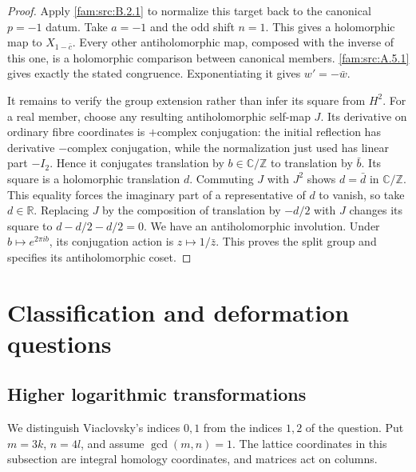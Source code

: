 \begin{proof}
Apply \ref{fam:src:B.2.1} to normalize this target back to the canonical $p=-1$ datum. Take $a=-1$ and the odd shift $n=1$. This gives a holomorphic map to $X_{1-\bar c}$. Every other antiholomorphic map, composed with the inverse of this one, is a holomorphic comparison between canonical members. \ref{fam:src:A.5.1} gives exactly the stated congruence. Exponentiating it gives $w'=-\bar w$.

It remains to verify the group extension rather than infer its square from $H^2$. For a real member, choose any resulting antiholomorphic self-map $J$. Its derivative on ordinary fibre coordinates is $+\text{complex conjugation}$: the initial reflection has derivative $-\text{complex conjugation}$, while the normalization just used has linear part $-I_2$. Hence it conjugates translation by $b\in\mathbb C/\mathbb Z$ to translation by $\bar b$. Its square is a holomorphic translation $d$. Commuting $J$ with $J^2$ shows $d=\bar d$ in $\mathbb C/\mathbb Z$. This equality forces the imaginary part of a representative of $d$ to vanish, so take $d\in\mathbb R$. Replacing $J$ by the composition of translation by $-d/2$ with $J$ changes its square to $d-d/2-d/2=0$. We have an antiholomorphic involution. Under $b\mapsto e^{2\pi ib}$, its conjugation action is $z\mapsto1/\bar z$. This proves the split group and specifies its antiholomorphic coset.
\end{proof}



\section{Classification and deformation questions}\label{push:section:E}
\subsection{Higher logarithmic transformations}\label{push:section:E.1}
We distinguish Viaclovsky's indices $0,1$ from the indices $1,2$ of
the question.  Put $m=3k$, $n=4l$, and assume $\gcd(m,n)=1$.
The lattice coordinates in this subsection are integral homology
coordinates, and matrices act on columns.

